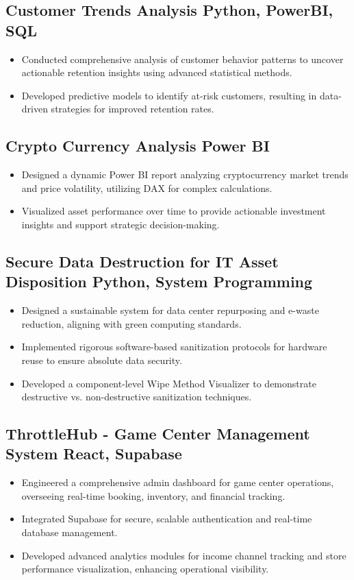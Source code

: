 \subsection{{Customer Trends Analysis} \hfill Python, PowerBI, SQL}
\begin{itemize}
\item Conducted comprehensive analysis of customer behavior patterns to uncover actionable retention insights using advanced statistical methods.
\item Developed predictive models to identify at-risk customers, resulting in data-driven strategies for improved retention rates.
\end{itemize}

\subsection{{Crypto Currency Analysis} \hfill Power BI}
\begin{itemize}
\item Designed a dynamic Power BI report analyzing cryptocurrency market trends and price volatility, utilizing DAX for complex calculations.
\item Visualized asset performance over time to provide actionable investment insights and support strategic decision-making.
\end{itemize}

\subsection{{Secure Data Destruction for IT Asset Disposition} \hfill Python, System Programming}
\begin{itemize}
\item Designed a sustainable system for data center repurposing and e-waste reduction, aligning with green computing standards.
\item Implemented rigorous software-based sanitization protocols for hardware reuse to ensure absolute data security.
\item Developed a component-level Wipe Method Visualizer to demonstrate destructive vs. non-destructive sanitization techniques.
\end{itemize}

\subsection{{ThrottleHub - Game Center Management System} \hfill React, Supabase}
\begin{itemize}
\item Engineered a comprehensive admin dashboard for game center operations, overseeing real-time booking, inventory, and financial tracking.
\item Integrated Supabase for secure, scalable authentication and real-time database management.
\item Developed advanced analytics modules for income channel tracking and store performance visualization, enhancing operational visibility.
\end{itemize}

